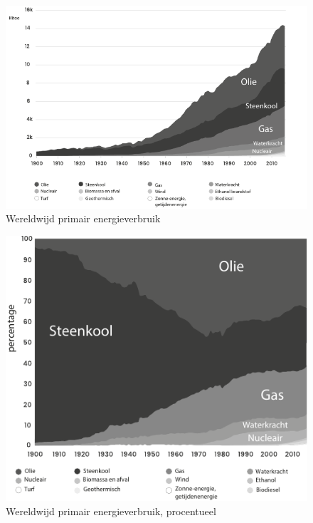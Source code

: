 \begin{figure}[!htb]
\centering
    \includegraphics[width=\textwidth]{figures/fig10.pdf}
\caption[Wereldwijd primair energieverbruik]{Wereldwijd primair energieverbruik\footnotemark}
\label{fig10}
\end{figure}
\autocite{98}

\begin{figure}[!htb]
\centering
    \includegraphics[width=\textwidth]{figures/fig11.pdf}
\caption[Wereldwijd primair energieverbruik, procentueel]{Wereldwijd primair energieverbruik, procentueel\footnotemark}
\label{fig11}
\end{figure}
\autocite{99}

